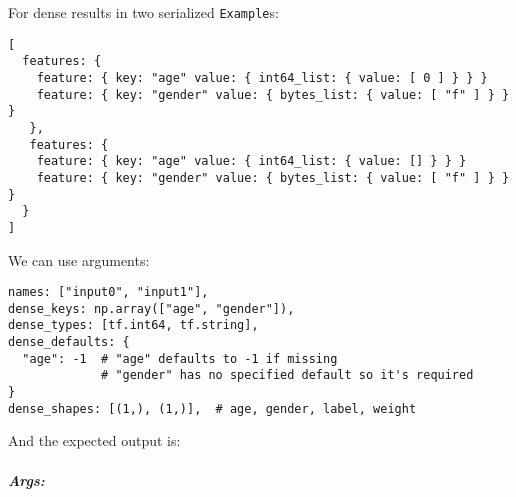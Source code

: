 For dense results in two serialized \texttt{Example}s:

\begin{verbatim}
[
  features: {
    feature: { key: "age" value: { int64_list: { value: [ 0 ] } } }
    feature: { key: "gender" value: { bytes_list: { value: [ "f" ] } } }
   },
   features: {
    feature: { key: "age" value: { int64_list: { value: [] } } }
    feature: { key: "gender" value: { bytes_list: { value: [ "f" ] } } }
  }
]
\end{verbatim}

We can use arguments:

\begin{verbatim}
names: ["input0", "input1"],
dense_keys: np.array(["age", "gender"]),
dense_types: [tf.int64, tf.string],
dense_defaults: {
  "age": -1  # "age" defaults to -1 if missing
             # "gender" has no specified default so it's required
}
dense_shapes: [(1,), (1,)],  # age, gender, label, weight
\end{verbatim}

And the expected output is:

\begin{Shaded}
\begin{Highlighting}[]
\NormalTok{\{}
  \NormalTok{: [[}\NormalTok{], [}\OperatorTok{-}\NormalTok{]],}
  \NormalTok{: [[}\NormalTok{], [}\NormalTok{]],}
\NormalTok{\}}
\end{Highlighting}
\end{Shaded}

\subparagraph{Args: }\label{args-45}

